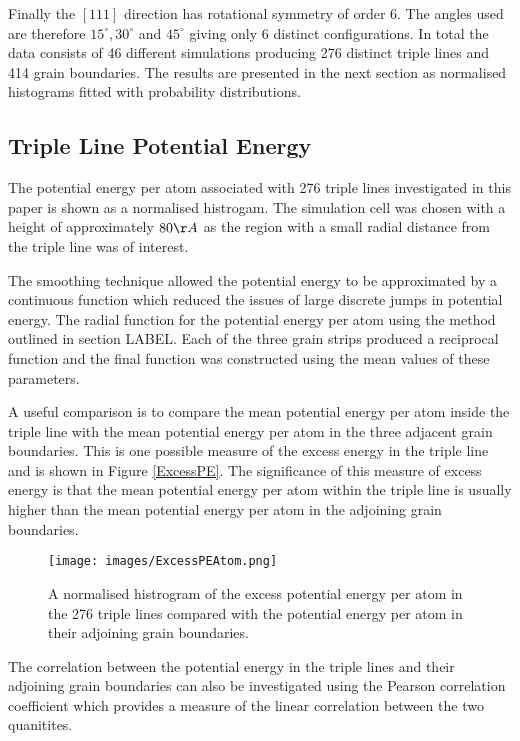 \documentclass[12pt,a4paper]{book}
\begin{document}
Finally the $[1 1 1]$ direction has rotational symmetry of order 6. The angles used are therefore $15^{\circ},30^{\circ}$  and $45^{\circ}$ giving only 6 distinct configurations. In total the data consists of 46 different simulations producing 276 distinct triple lines and 414 grain boundaries. The results are presented in the next section as normalised histograms fitted with probability distributions.  

\subsection{Triple Line Potential Energy}

The potential energy per atom associated with 276 triple lines investigated in this paper is shown as a normalised histrogam. The simulation cell was chosen with a height of approximately $80\AA$ as the region with a small radial distance from the triple line was of interest. 

The smoothing technique allowed the potential energy to be approximated by a continuous function which reduced the issues of large discrete jumps in potential energy. The radial function for the potential energy per atom using the method outlined in section LABEL. Each of the three grain strips produced a reciprocal function and the final function was constructed using the mean values of these parameters. 


A useful comparison is to compare the mean potential energy per atom inside the triple line with the mean potential energy per atom in the three adjacent grain boundaries. This is one possible measure of the excess energy in the triple line and is shown in Figure \ref{ExcessPE}. The significance of this measure of excess energy is that the mean potential energy per atom within the triple line is usually higher than the mean potential energy per atom in the adjoining grain boundaries.

\begin{figure}[H]
	\texttt{[image: images/ExcessPEAtom.png]} 
	\label{fig:ExcessPE}
	\caption{A normalised histrogram of the excess potential energy per atom in the 276 triple lines compared with the potential energy per atom in their adjoining grain boundaries.}
\end{figure}

The correlation between the potential energy in the triple lines and their adjoining grain boundaries can also be investigated using the Pearson correlation coefficient which provides a measure of the linear correlation between the two quanitites.
\end{document}
